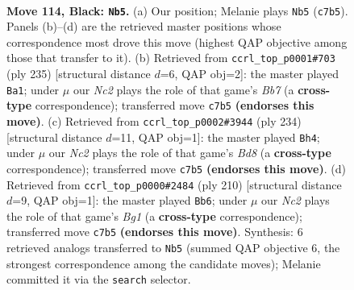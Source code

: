 \documentclass[11pt]{article}
\begin{document}
\clearpage

\begin{figure}[p]\centering
\begin{subfigure}{0.46\textwidth}\centering
\resizebox{\linewidth}{!}{%
\newchessgame
\chessboard[
  setfen={2B5/2n3k1/8/6P1/6KP/8/8/8 b - - 1 114},
  showmover=false,
  pgfstyle=straightmove, color=movearrow, markmove={c7-b5}
]}
\caption{}
\end{subfigure}\hfill
\begin{subfigure}{0.46\textwidth}\centering
\resizebox{\linewidth}{!}{%
\newchessgame
\chessboard[
  setfen={8/5k2/8/5PP1/6K1/8/1b2B3/8 b - - 86 118},
  showmover=false,
  pgfstyle=straightmove, color=movearrow, markmove={b2-a1}
]}
\caption{}
\end{subfigure}
\\[4pt]
\begin{subfigure}{0.46\textwidth}\centering
\resizebox{\linewidth}{!}{%
\newchessgame
\chessboard[
  setfen={3B4/8/8/5k1p/4bp2/8/5K2/8 w - - 82 118},
  showmover=false,
  pgfstyle=straightmove, color=movearrow, markmove={d8-h4}
]}
\caption{}
\end{subfigure}\hfill
\begin{subfigure}{0.46\textwidth}\centering
\resizebox{\linewidth}{!}{%
\newchessgame
\chessboard[
  setfen={8/8/8/8/4b3/3p1k2/6p1/3K2B1 w - - 18 106},
  showmover=false,
  pgfstyle=straightmove, color=movearrow, markmove={g1-b6}
]}
\caption{}
\end{subfigure}
\caption{\textbf{Move 114, Black: \texttt{Nb5}.} (a) Our position; Melanie plays \texttt{Nb5} (\texttt{c7b5}). Panels (b)--(d) are the retrieved master positions whose correspondence most drove this move (highest QAP objective among those that transfer to it). (b) Retrieved from \texttt{ccrl\_top\_p0001\#703} (ply 235) [structural distance $d$=6, QAP obj=2]: the master played \texttt{Ba1}; under $\mu$ our \emph{Nc2} plays the role of that game's \emph{Bb7} (a \textbf{cross-type} correspondence); transferred move \texttt{c7b5} \textbf{(endorses this move)}. (c) Retrieved from \texttt{ccrl\_top\_p0002\#3944} (ply 234) [structural distance $d$=11, QAP obj=1]: the master played \texttt{Bh4}; under $\mu$ our \emph{Nc2} plays the role of that game's \emph{Bd8} (a \textbf{cross-type} correspondence); transferred move \texttt{c7b5} \textbf{(endorses this move)}. (d) Retrieved from \texttt{ccrl\_top\_p0000\#2484} (ply 210) [structural distance $d$=9, QAP obj=1]: the master played \texttt{Bb6}; under $\mu$ our \emph{Nc2} plays the role of that game's \emph{Bg1} (a \textbf{cross-type} correspondence); transferred move \texttt{c7b5} \textbf{(endorses this move)}. Synthesis: 6 retrieved analogs transferred to \texttt{Nb5} (summed QAP objective 6, the strongest correspondence among the candidate moves); Melanie committed it via the \texttt{search} selector.}
\label{fig:thought-m227}
\end{figure}
\end{document}
